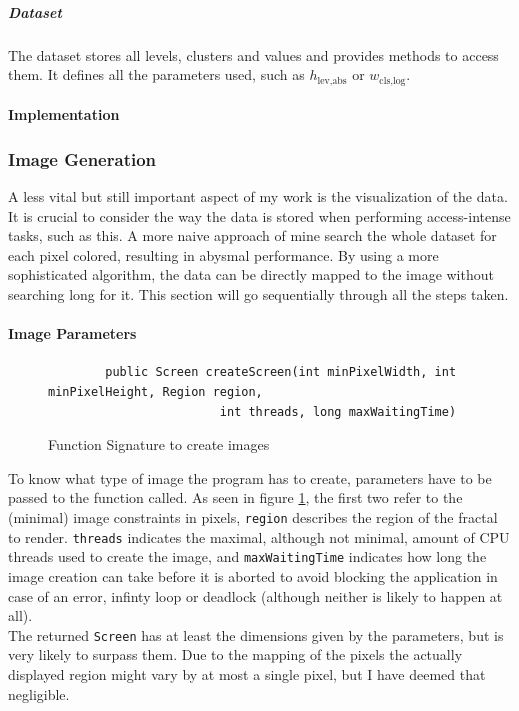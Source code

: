 \documentclass[10pt,a4paper,titlepage]{article}
\begin{document}
	\subparagraph{Dataset}
	The dataset stores all levels, clusters and values and provides methods to access them. It defines all the parameters used, such as \(h_{\text{lev,abs}}\) or \(w_{\text{cls,log}}\).
	\paragraph{Implementation}
	
	\subsubsection{Image Generation}
	A less vital but still important aspect of my work is the visualization of the data. It is crucial to consider the way the data is stored when performing access-intense tasks, such as this. A more naive approach of mine search the whole dataset for each pixel colored, resulting in abysmal performance. By using a more sophisticated algorithm, the data can be directly mapped to the image without searching long for it. This section will go sequentially through all the steps taken.
	\paragraph{Image Parameters}
	\begin{figure}
		\centering
		\caption{Function Signature to create images}
		\label{fig:image_signature}
		\begin{verbatim}
		public Screen createScreen(int minPixelWidth, int minPixelHeight, Region region,
		                int threads, long maxWaitingTime)
		\end{verbatim}
	\end{figure}
	To know what type of image the program has to create, parameters have to be passed to the function called. As seen in figure \ref{fig:image_signature}, the first two refer to the (minimal) image constraints in pixels, \verb|region| describes the region of the fractal to render. \verb|threads| indicates the maximal, although not minimal, amount of CPU threads used to create the image, and \verb|maxWaitingTime| indicates how long the image creation can take before it is aborted to avoid blocking the application in case of an error, infinty loop or deadlock (although neither is likely to happen at all).\\
	The returned \verb|Screen| has at least the dimensions given by the parameters, but is very likely to surpass them. Due to the mapping of the pixels the actually displayed region might vary by at most a single pixel, but I have deemed that negligible.	
\end{document}
